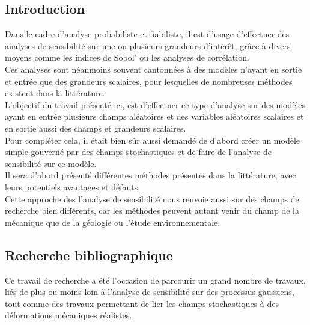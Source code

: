 \documentclass[a4paper,10pt]{article}
\begin{document}
\subsection{Introduction}
Dans le cadre d'analyse probabiliste et fiabiliste, il est d'usage d’effectuer des analyses de sensibilité sur une ou plusieurs grandeurs d’intérêt, grâce à divers moyens comme les indices de Sobol' ou les analyses de corrélation. \\
Ces analyses sont néanmoins souvent cantonnées à des modèles n'ayant en sortie et entrée que des grandeurs scalaires, pour lesquelles de nombreuses méthodes existent dans la littérature.\\
L'objectif du travail présenté ici, est d’effectuer ce type d'analyse sur des modèles ayant en entrée plusieurs champs aléatoires et des variables aléatoires scalaires et en sortie aussi des champs et grandeurs scalaires. \\ Pour compléter cela, il était bien sûr aussi demandé de d'abord créer un modèle simple gouverné par des champs stochastiques et de faire de l'analyse de sensibilité sur ce modèle. \\
Il sera d'abord présenté différentes méthodes présentes dans la littérature, avec leurs potentiels avantages et défauts. \\ 
Cette approche des l'analyse de sensibilité nous renvoie aussi sur des champs de recherche bien différents, car les méthodes peuvent autant venir du champ de la mécanique que de la géologie ou l'étude environnementale.

 
\subsection{Recherche bibliographique}
Ce travail de recherche a été l'occasion de parcourir un grand nombre de travaux, liés de plus ou moins loin à l'analyse de sensibilité sur des processus gaussiens, tout comme des travaux permettant de lier les champs stochastiques à des déformations mécaniques réalistes.\par \smallskip
\end{document}
